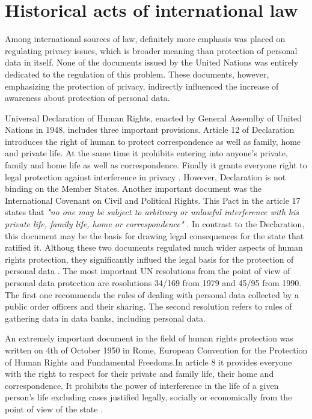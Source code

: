 \documentclass[en, noamssymb]{mgr}
\begin{document}
\section{Historical acts of international law}

\indent Among international sources of law, definitely more emphasis was placed on regulating privacy issues, which is broader meaning than protection of personal data in itself. None of the documents issued by the United Nations was entirely dedicated to the regulation of this problem. These documents, however, emphasizing the protection of privacy, indirectly influenced the increase of awareness about protection of personal data.

\indent Universal Declaration of Human Rights, enacted by General Assemlby of United Nations in 1948, includes three important provisions. Article 12 of Declaration introduces the right of human to protect correspondence as well as family, home and private life. At the same time it prohibits entering into anyone's private, family and home life as well as correspondence. Finally it grants everyone right to legal protection against interference in privacy \cite{prawo_odo}. However, Declaration is not binding on the Member States. Another important document was the International Covenant on Civil and Political Rights. This Pact in the article 17 states that \textit{"no one may be subject to arbitrary or unlawful interference with his private life, family life, home or correspondence"} \cite{prawo_odo}. In contrast to the Declaration, this document may be the basis for drawing legal consequences for the state that ratified it. Althoug these two documents regulated much wider aspects of human rights protection, they significantly influed the legal basis for the protection of personal data \cite{prawo_odo}. The most important UN resolutions from the point of view of personal data protection are rosolutions 34/169 from 1979 and 45/95 from 1990. The first one recommends the rules of dealing with personal data collected by a public order officers and their sharing. The second resolution refers to rules of gathering data in data banks, including personal data.

\indent An extremely important document in the field of human rights protection was written on 4th of October 1950 in Rome, European Convention for the Protection of Human Rights and Fundamental Freedoms.In article 8 it provides everyone with the right to respect for their private and family life, their home and correspondence. It prohibits the power of interference in the life of a given person's life excluding cases justified legally, socially or economically from the point of view of the state \cite{prawo_odo}.
\end{document}
